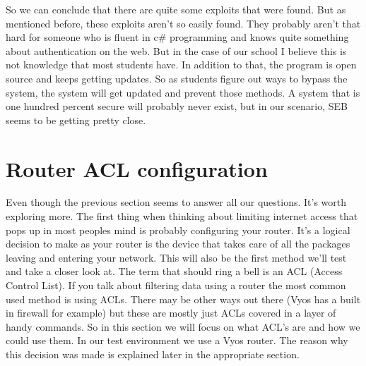 So we can conclude that there are quite some exploits that were found. But as mentioned before, these exploits aren't so easily found. They probably aren't that hard for someone who is fluent in c\# programming and knows quite something about authentication on the web. But in the case of our school I believe this is not knowledge that most students have. In addition to that, the program is open source and keeps getting updates. So as students figure out ways to bypass the system, the system will get updated and prevent those methods.
A system that is one hundred percent secure will probably never exist, but in our scenario, SEB seems to be getting pretty close.

\section{Router ACL configuration}
Even though the previous section seems to answer all our questions. It's worth exploring more. The first thing when thinking about limiting internet access that pops up in most peoples mind is probably configuring your router.  It's a logical decision to make as your router is the device that takes care of all the packages leaving and entering your network. This will also be the first method we'll test and take a closer look at. The term that should ring a bell is an ACL (Access Control List). If you talk about filtering data using a router the most common used method is using ACLs. There may be other ways out there (Vyos has a built in firewall for example) but these are mostly just ACLs covered in a layer of handy commands. So in this section we will focus on what ACL's are and how we could use them.
In our test environment we use a Vyos router. The reason why this decision was made is explained later in the appropriate section.
